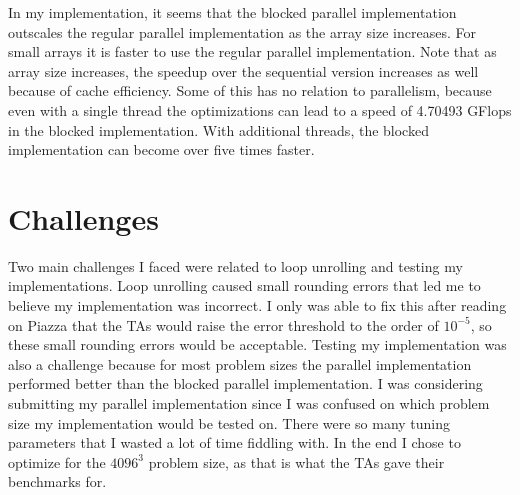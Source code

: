 \documentclass[12pt]{article}
\begin{document}
In my implementation, it seems that the blocked parallel implementation outscales the regular parallel implementation
as the array size increases. For small arrays it is faster to use the regular parallel implementation. Note that
as array size increases, the speedup over the sequential version increases as well because of cache efficiency. Some
of this has no relation to parallelism, because even with a single thread the optimizations can lead to a speed of
4.70493 GFlops in the blocked implementation. With additional threads, the blocked implementation can become over five
times faster.

\section{Challenges}

Two main challenges I faced were related to loop unrolling and testing my implementations. Loop unrolling caused small
rounding errors that led me to believe my implementation was incorrect. I only was able to fix this after reading on Piazza
that the TAs would raise the error threshold to the order of \(10^{-5}\), so these small rounding errors would be acceptable.
Testing my implementation was also a challenge because for most problem sizes the parallel implementation performed better than
the blocked parallel implementation. I was considering submitting my parallel implementation since I was confused on which
problem size my implementation would be tested on. There were so many tuning parameters that I wasted a lot of time fiddling with.
In the end I chose to optimize for the \(4096^3\) problem size, as that is what the TAs gave their benchmarks for.
\end{document}
